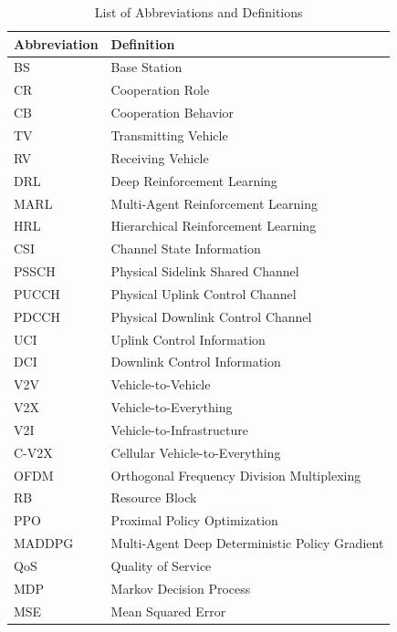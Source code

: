 \begin{table}[h]
    \centering
    \caption{List of Abbreviations and Definitions}
    \label{tab:abbreviations}
    \begin{tabular}{ll}
        \toprule
        \textbf{Abbreviation} & \textbf{Definition} \\
        \midrule
        BS & Base Station \\
        CR & Cooperation Role \\
        CB & Cooperation Behavior \\
        TV & Transmitting Vehicle \\
        RV & Receiving Vehicle \\
        DRL & Deep Reinforcement Learning \\
        MARL & Multi-Agent Reinforcement Learning \\
        HRL & Hierarchical Reinforcement Learning \\
        CSI & Channel State Information \\
        PSSCH & Physical Sidelink Shared Channel \\
        PUCCH & Physical Uplink Control Channel \\
        PDCCH & Physical Downlink Control Channel \\
        UCI & Uplink Control Information \\
        DCI & Downlink Control Information \\
        V2V & Vehicle-to-Vehicle \\
        V2X & Vehicle-to-Everything \\
        V2I & Vehicle-to-Infrastructure \\
        C-V2X & Cellular Vehicle-to-Everything \\
        OFDM & Orthogonal Frequency Division Multiplexing \\
        RB & Resource Block \\
        PPO & Proximal Policy Optimization \\
        MADDPG & Multi-Agent Deep Deterministic Policy Gradient \\
        QoS & Quality of Service \\
        MDP & Markov Decision Process \\
        MSE & Mean Squared Error \\
        \bottomrule
    \end{tabular}
\end{table}






\clearpage
\markboth{}{}
\printbibliography[heading=bibintoc, heading=bibliography, title={References}, section=\therefsection]
\markboth{}{}


